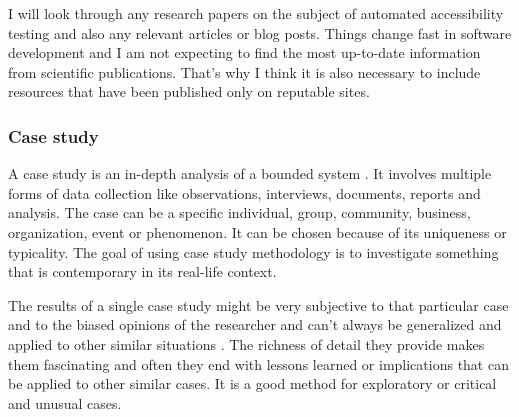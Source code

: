 \documentclass{master_thesis}
\begin{document}
I will look through any research papers on the subject of automated accessibility testing and also any relevant articles or blog posts. Things change fast in software development and I am not expecting to find the most up-to-date information from scientific publications. That's why I think it is also necessary to include resources that have been published only on reputable sites.





\subsubsection{Case study}

A case study is an in-depth analysis of a bounded system \citep{Range2023}. It involves multiple forms of data collection like observations, interviews, documents, reports and analysis. The case can be a specific individual, group, community, business, organization, event or phenomenon. It can be chosen because of its uniqueness or typicality. The goal of using case study methodology is to investigate something that is contemporary in its real-life context.

The results of a single case study might be very subjective to that particular case and to the biased opinions of the researcher and can't always be generalized and applied to other similar situations \citep{Range2023}. The richness of detail they provide makes them fascinating and often they end with lessons learned or implications that can be applied to other similar cases. It is a good method for exploratory or critical and unusual cases.
\end{document}
